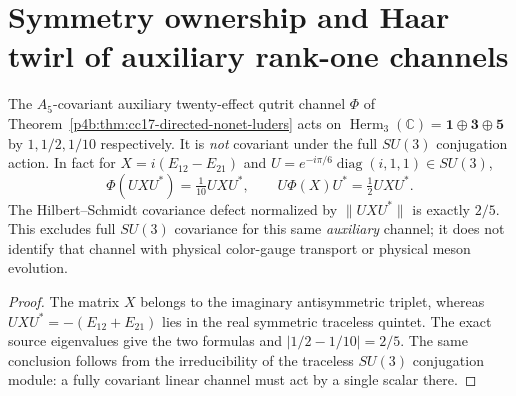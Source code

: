 \documentclass[12pt,a4paper]{article}
\begin{document}
\section{Symmetry ownership and Haar twirl of auxiliary rank-one channels}
\label{p4b:sec:cc18-su3-nonet-twirl}
\begin{theorem}
\label{p4b:thm:cc18-nonet-su3-obstruction}
The $A_5$-covariant auxiliary twenty-effect qutrit channel
$\Phi$ of Theorem~\ref{p4b:thm:cc17-directed-nonet-luders}
acts on $\operatorname{Herm}_3(\mathbb C)=\mathbf1\oplus\mathbf3
\oplus\mathbf5$ by $1,1/2,1/10$ respectively.  It is \emph{not}
covariant under the full $SU(3)$ conjugation action.  In fact for
$X=i(E_{12}-E_{21})$ and
$U=e^{-i\pi/6}\operatorname{diag}(i,1,1)\in SU(3)$,
\[
\boxed{\Phi(UXU^*)=\tfrac1{10}UXU^*,\qquad
U\Phi(X)U^*=\tfrac12 UXU^*.}
\]
The Hilbert--Schmidt covariance defect normalized by $\|UXU^*\|$
is exactly $2/5$.  This excludes full $SU(3)$ covariance for this
same \emph{auxiliary} channel; it does not identify that channel with
physical color-gauge transport or physical meson evolution.
\end{theorem}
\begin{proof}
The matrix $X$ belongs to the imaginary antisymmetric triplet,
whereas $UXU^*=-(E_{12}+E_{21})$ lies in the real symmetric
traceless quintet.  The exact source eigenvalues give the two
formulas and $|1/2-1/10|=2/5$.  The same conclusion follows from the
irreducibility of the traceless $SU(3)$ conjugation module: a fully
covariant linear channel must act by a single scalar there.
\end{proof}
\end{document}
